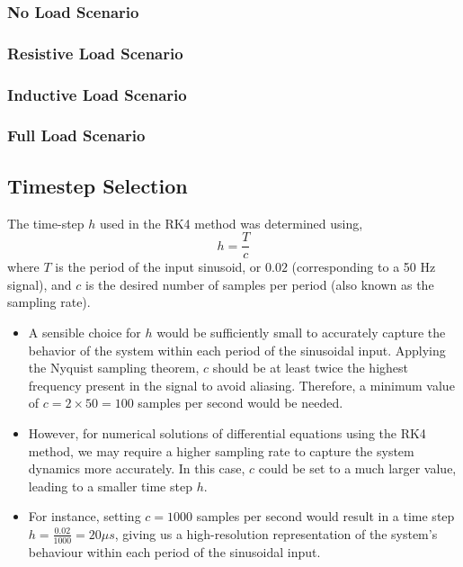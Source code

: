 

\subsubsection{No Load Scenario}


\subsubsection{Resistive Load Scenario}


\subsubsection{Inductive Load Scenario}


\subsubsection{Full Load Scenario}


\pagebreak
\subsection{Timestep Selection}
The time-step $h$ used in the RK4 method was determined using,
\begin{equation}
	h = \frac{T}{c}
\end{equation}
where $T$ is the period of the input sinusoid, or $0.02$  (corresponding to a 50 Hz signal), and $c$ is the desired number of samples per period (also known as the sampling rate).
\begin{itemize}
	\item A sensible choice for \(h\) would be sufficiently small to accurately capture the behavior of the system within each period of the sinusoidal input. Applying the Nyquist sampling theorem, \(c\) should be at least twice the highest frequency present in the signal to avoid aliasing. Therefore, a minimum value of \(c = 2 \times 50 = 100\) samples per second would be needed.
	\item However, for numerical solutions of differential equations using the RK4 method, we may require a higher sampling rate to capture the system dynamics more accurately. In this case, \(c\) could be set to a much larger value, leading to a smaller time step \(h\).
	\item For instance, setting \(c = 1000\) samples per second would result in a time step $h = \frac{0.02}{1000} = 20\mu s$, giving us a high-resolution representation of the system's behaviour within each period of the sinusoidal input.
\end{itemize}

